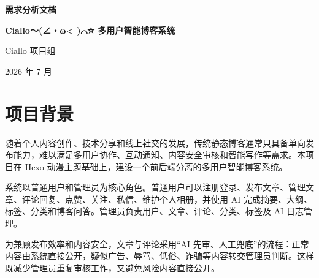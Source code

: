 \documentclass[UTF8,a4paper,12pt]{ctexart}
\newcommand{\ProjectName}{Ciallo～(∠・ω< )⌒☆ 多用户智能博客系统}
\newcommand{\CourseName}{Web 高级程序设计实训}
\newcommand{\DocVersion}{V1.0}
\newcommand{\DocDate}{2026 年 7 月 9 日}
\newcommand{\GroupName}{1 组}
\newcommand{\TeacherName}{李玉莹}
\begin{document}
\begin{titlepage}
  \centering
  \vspace*{1.2cm}
  {\fontsize{34pt}{42pt}\selectfont\bfseries\color{mainblue} 需求分析文档\par}
  \vspace{0.9cm}
  {\parbox{0.92\textwidth}{\centering\fontsize{22pt}{30pt}\selectfont\bfseries \ProjectName}\par}
  \vspace{1.5cm}


  \vfill
  {\large Ciallo 项目组\par}
  \vspace{0.4cm}
  {\large 2026 年 7 月\par}
\end{titlepage}

\tableofcontents
\newpage

\section{项目背景}

随着个人内容创作、技术分享和线上社交的发展，传统静态博客通常只具备单向发布能力，难以满足多用户协作、互动通知、内容安全审核和智能写作等需求。本项目在 Hexo 动漫主题基础上，建设一个前后端分离的多用户智能博客系统。

系统以普通用户和管理员为核心角色。普通用户可以注册登录、发布文章、管理文章、评论回复、点赞、关注、私信、维护个人相册，并使用 AI 完成摘要、大纲、标签、分类和博客问答。管理员负责用户、文章、评论、分类、标签及 AI 日志管理。

为兼顾发布效率和内容安全，文章与评论采用“AI 先审、人工兜底”的流程：正常内容由系统直接公开，疑似广告、辱骂、低俗、诈骗等内容转交管理员判断。这样既减少管理员重复审核工作，又避免风险内容直接公开。
\end{document}
